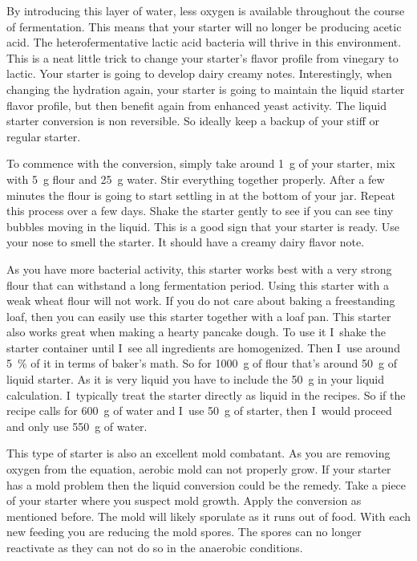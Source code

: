 By introducing this layer of water, less oxygen is available throughout the
course of fermentation. This means that your starter will no longer be
producing acetic acid. The heterofermentative lactic acid bacteria will thrive
in this environment. This is a neat little trick to change your starter's
flavor profile from vinegary to lactic. Your starter is going to develop
dairy creamy notes. Interestingly, when changing the hydration again, your starter
is going to maintain the liquid starter flavor profile, but then benefit again
from enhanced yeast activity. The liquid starter conversion is non reversible.
So ideally keep a backup of your stiff or regular starter.

To commence with the
conversion, simply take around \qty{1}{\gram} of your starter, mix with \qty{5}{\gram} flour and
\qty{25}{\gram} water. Stir everything together properly. After a few minutes the flour is
going to start settling in at the bottom of your jar. Repeat this process over
a few days. Shake the starter gently to see if you can see tiny  bubbles
moving in the liquid. This is a good sign that your starter is ready. Use your
nose to smell the starter. It should have a creamy dairy flavor note.

As you have more bacterial activity, this starter works best with a very strong
flour that can withstand a long fermentation period. Using this starter with a
weak wheat flour will not work. If you do not care about baking a freestanding loaf,
then you can easily use this starter together with a loaf pan.
This starter also works great when making a hearty pancake dough. To use it
I~shake the starter container until I~see all ingredients are homogenized.  Then
I~use around \qty{5}{\percent} of it in terms of baker's math. So for \qty{1000}{\gram} of flour
that's around \qty{50}{\gram} of liquid starter. As it is very liquid you have to
include the \qty{50}{\gram} in your liquid calculation. I~typically treat the starter
directly as liquid in the recipes. So if the recipe calls for \qty{600}{\gram} of water
and I~use \qty{50}{\gram} of starter, then I~would proceed and only use \qty{550}{\gram} of
water.

This type of starter is also an excellent mold combatant. As you are removing
oxygen from the equation, aerobic mold can not properly grow. If your starter
has a mold problem then the liquid conversion could be the remedy. Take a
piece of your starter where you suspect mold growth. Apply the conversion
as mentioned before. The mold will likely sporulate as it runs out of food.
With each new feeding you are reducing the mold spores. The spores can no
longer reactivate as they can not do so in the anaerobic conditions.

